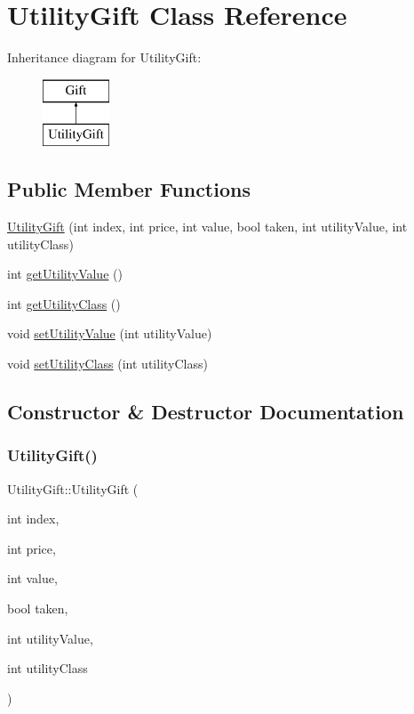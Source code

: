 \hypertarget{class_utility_gift}{}\section{Utility\+Gift Class Reference}
\label{class_utility_gift}
Inheritance diagram for Utility\+Gift\+:\begin{figure}[H]
\begin{center}
\leavevmode
\includegraphics[height=2.000000cm]{class_utility_gift}
\end{center}
\end{figure}
\subsection*{Public Member Functions}
\begin{DoxyCompactItemize}
\item 
\hyperlink{class_utility_gift_a59535bee63b46cdf9973a2a986829736}{Utility\+Gift} (int index, int price, int value, bool taken, int utility\+Value, int utility\+Class)
\item 
int \hyperlink{class_utility_gift_ad40c77a46869bdedc03de940ff64e42e}{get\+Utility\+Value} ()
\item 
int \hyperlink{class_utility_gift_a6a7f37fde70bb92718d6c0b751a092c5}{get\+Utility\+Class} ()
\item 
void \hyperlink{class_utility_gift_a7dbd7e650be49d1f4e28b16b9a78a4c7}{set\+Utility\+Value} (int utility\+Value)
\item 
void \hyperlink{class_utility_gift_acad2ce4adfa16775a6676fb140468fb4}{set\+Utility\+Class} (int utility\+Class)
\end{DoxyCompactItemize}


\subsection{Constructor \& Destructor Documentation}
\mbox{\label{class_utility_gift_a59535bee63b46cdf9973a2a986829736}} 
\subsubsection{\texorpdfstring{Utility\+Gift()}{UtilityGift()}}
{\footnotesize\ttfamily Utility\+Gift\+::\+Utility\+Gift (\begin{DoxyParamCaption}\item[{int}]{index,  }\item[{int}]{price,  }\item[{int}]{value,  }\item[{bool}]{taken,  }\item[{int}]{utility\+Value,  }\item[{int}]{utility\+Class }\end{DoxyParamCaption})}

